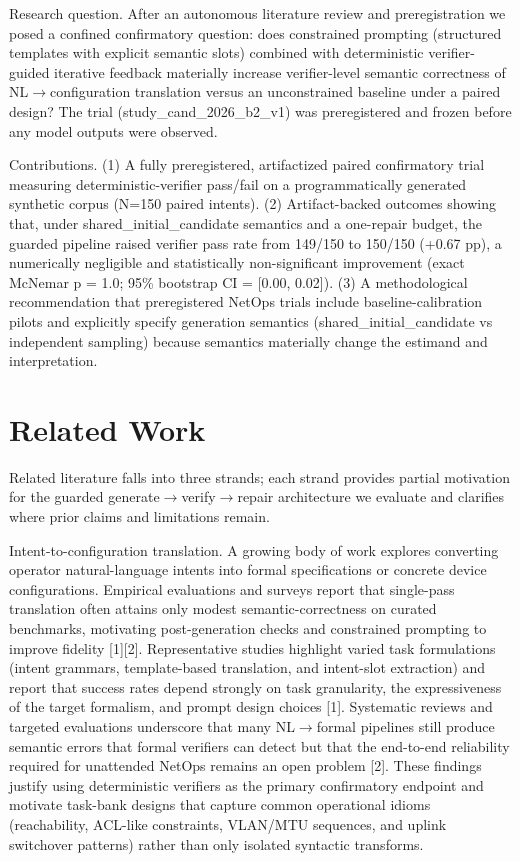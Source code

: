 \documentclass[conference]{IEEEtran}
\begin{document}
Research question. After an autonomous literature review and preregistration we posed a confined confirmatory question: does constrained prompting (structured templates with explicit semantic slots) combined with deterministic verifier-guided iterative feedback materially increase verifier-level semantic correctness of NL\ensuremath{\rightarrow}configuration translation versus an unconstrained baseline under a paired design? The trial (study\_cand\_2026\_b2\_v1) was preregistered and frozen before any model outputs were observed.

Contributions. (1) A fully preregistered, artifactized paired confirmatory trial measuring deterministic-verifier pass/fail on a programmatically generated synthetic corpus (N=150 paired intents). (2) Artifact-backed outcomes showing that, under shared\_initial\_candidate semantics and a one-repair budget, the guarded pipeline raised verifier pass rate from 149/150 to 150/150 (+0.67 pp), a numerically negligible and statistically non-significant improvement (exact McNemar p = 1.0; 95\% bootstrap CI = [0.00, 0.02]). (3) A methodological recommendation that preregistered NetOps trials include baseline-calibration pilots and explicitly specify generation semantics (shared\_initial\_candidate vs independent sampling) because semantics materially change the estimand and interpretation.

\section{Related Work}
Related literature falls into three strands; each strand provides partial motivation for the guarded generate\ensuremath{\rightarrow}verify\ensuremath{\rightarrow}repair architecture we evaluate and clarifies where prior claims and limitations remain.

Intent-to-configuration translation. A growing body of work explores converting operator natural-language intents into formal specifications or concrete device configurations. Empirical evaluations and surveys report that single-pass translation often attains only modest semantic-correctness on curated benchmarks, motivating post-generation checks and constrained prompting to improve fidelity [1][2]. Representative studies highlight varied task formulations (intent grammars, template-based translation, and intent-slot extraction) and report that success rates depend strongly on task granularity, the expressiveness of the target formalism, and prompt design choices [1]. Systematic reviews and targeted evaluations underscore that many NL\ensuremath{\rightarrow}formal pipelines still produce semantic errors that formal verifiers can detect but that the end-to-end reliability required for unattended NetOps remains an open problem [2]. These findings justify using deterministic verifiers as the primary confirmatory endpoint and motivate task-bank designs that capture common operational idioms (reachability, ACL-like constraints, VLAN/MTU sequences, and uplink switchover patterns) rather than only isolated syntactic transforms.
\end{document}
